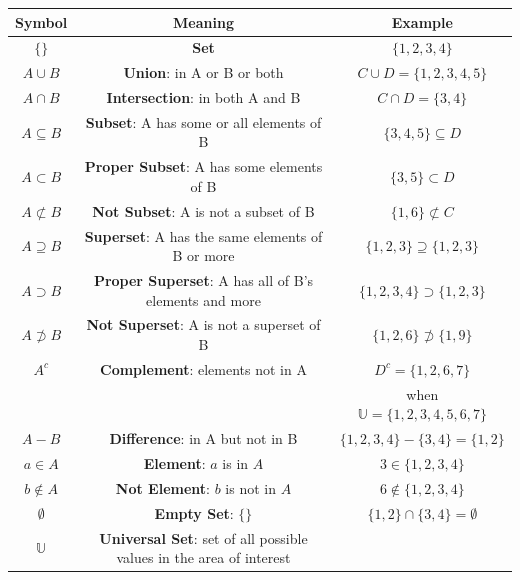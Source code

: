         \begin{center}
            \begin{tabular}{|c|c|c|}
                \hline
                \textbf{Symbol} & \textbf{Meaning} & \textbf{Example} \\\hline
                $\{ \}$ & \textbf{Set} & $\{1,2,3,4\}$ \\ \hline
                $A \cup B$ & \textbf{Union}: in A or B or both & $C\cup D=\{1,2,3,4,5\}$ \\ \hline
                $A\cap B$ & \textbf{Intersection}: in both A and B & $C\cap D=\{3,4\}$ \\ \hline
                $A\subseteq B$ & \textbf{Subset}: A has some or all elements of B & $\{3,4,5\}\subseteq D$ \\ \hline
                $A\subset B$ & \textbf{Proper Subset}: A has some elements of B & $\{3,5\}\subset D$ \\ \hline
                $A\not\subset B$ & \textbf{Not Subset}: A is not a subset of B & $\{ 1,6 \} \not\subset C$ \\ \hline
                $A\supseteq B$ & \textbf{Superset}: A has the same elements of B or more & $\{1,2,3\}\supseteq \{1,2,3\}$ \\ \hline
                $A \supset B$ & \textbf{Proper Superset}: A has all of B's elements and more & $\{1,2,3,4\} \supset \{1,2,3\}$ \\ \hline
                $A \not\supset B$ & \textbf{Not Superset}: A is not a superset of B & $\{1,2,6\} \not\supset \{1,9\}$ \\ \hline
                $A^c$ & \textbf{Complement}: elements not in A & $D^c=\{1,2,6,7\}$  \\
                & & when $\mathbb{U}=\{1,2,3,4,5,6,7\}$ \\ \hline
                $A-B$ & \textbf{Difference}: in A but not in B & $\{1,2,3,4\}-\{3,4\}=\{1,2\}$ \\ \hline
                $a \in A$ & \textbf{Element}: $a$ is in $A$ & $3 \in \{1,2,3,4\}$ \\ \hline
                $b \notin A$ & \textbf{Not Element}: $b$ is not in $A$ & $6 \notin \{1,2,3,4\}$ \\ \hline
                $\emptyset$ & \textbf{Empty Set}: $\{\}$ & $\{1,2\} \cap\{3,4\}=\emptyset$ \\ \hline
                $\mathbb{U}$ & \textbf{Universal Set}: set of all possible values in the area of interest &   \\ \hline

\end{tabular}
\end{center}
